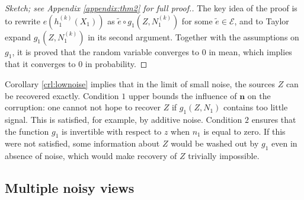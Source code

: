 \begin{proof}[Sketch; see Appendix \ref{appendix:thm2} for full proof.]
The key idea of the proof is to rewrite ${e}(h_1^{(k)}(X_1))$ as $\tilde{e} \circ g_1(Z, N_1^{(k)})$ for some $\tilde{e} \in \mathcal{E}$, and to Taylor expand $g_1(Z, N_1^{(k)})$ in its second argument.
Together with the assumptions on $g_1$, it is proved that the random variable converges to $0$ in mean, which implies that it converges to $0$ in probability.
\end{proof}

%	

Corollary \ref{crl:lownoise} implies that in the limit of small noise, the sources $Z$ can be recovered exactly.
Condition $1$ upper bounds the influence of $\bm{n}$ on the corruption: one cannot not hope to recover $Z$ if $g_1(Z, N_1)$ contains too little signal.
This is satisfied, for example, by additive noise.
Condition $2$ ensures that the function $g_1$ is invertible with respect to $z$ when $n_1$ is equal to zero.
If this were not satisfied, some information about $Z$ would be washed out by $g_1$ even in absence of noise, which would make recovery of $Z$ trivially impossible.


\subsection{Multiple noisy views}
\label{sec:multiple}

